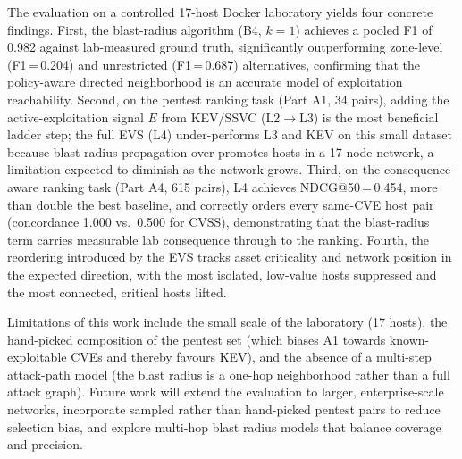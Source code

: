 \documentclass[conference]{IEEEtran}
\begin{document}
The evaluation on a controlled 17-host Docker laboratory yields four concrete findings. First, the blast-radius algorithm (B4, $k=1$) achieves a pooled F1 of 0.982 against lab-measured ground truth, significantly outperforming zone-level (F1\,=\,0.204) and unrestricted (F1\,=\,0.687) alternatives, confirming that the policy-aware directed neighborhood is an accurate model of exploitation reachability. Second, on the pentest ranking task (Part A1, 34 pairs), adding the active-exploitation signal $E$ from KEV/SSVC (L2$\rightarrow$L3) is the most beneficial ladder step; the full EVS (L4) under-performs L3 and KEV on this small dataset because blast-radius propagation over-promotes hosts in a 17-node network, a limitation expected to diminish as the network grows. Third, on the consequence-aware ranking task (Part A4, 615 pairs), L4 achieves NDCG@50\,=\,0.454, more than double the best baseline, and correctly orders every same-CVE host pair (concordance 1.000 vs.\ 0.500 for CVSS), demonstrating that the blast-radius term carries measurable lab consequence through to the ranking. Fourth, the reordering introduced by the EVS tracks asset criticality and network position in the expected direction, with the most isolated, low-value hosts suppressed and the most connected, critical hosts lifted.

Limitations of this work include the small scale of the laboratory (17 hosts), the hand-picked composition of the pentest set (which biases A1 towards known-exploitable CVEs and thereby favours KEV), and the absence of a multi-step attack-path model (the blast radius is a one-hop neighborhood rather than a full attack graph). Future work will extend the evaluation to larger, enterprise-scale networks, incorporate sampled rather than hand-picked pentest pairs to reduce selection bias, and explore multi-hop blast radius models that balance coverage and precision.
\end{document}
